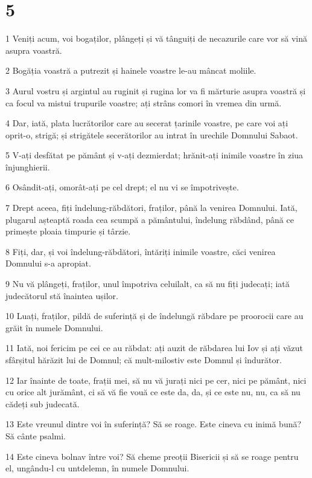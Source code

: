 \chapter{5}

\par 1 Veniți acum, voi bogaților, plângeți și vă tânguiți de necazurile care vor să vină asupra voastră.
\par 2 Bogăția voastră a putrezit și hainele voastre le-au mâncat moliile.
\par 3 Aurul vostru și argintul au ruginit și rugina lor va fi mărturie asupra voastră și ca focul va mistui trupurile voastre; ați strâns comori în vremea din urmă.
\par 4 Dar, iată, plata lucrătorilor care au secerat țarinile voastre, pe care voi ați oprit-o, strigă; și strigătele secerătorilor au intrat în urechile Domnului Sabaot.
\par 5 V-ați desfătat pe pământ și v-ați dezmierdat; hrănit-ați inimile voastre în ziua înjunghierii.
\par 6 Osândit-ați, omorât-ați pe cel drept; el nu vi se împotrivește.
\par 7 Drept aceea, fiți îndelung-răbdători, fraților, până la venirea Domnului. Iată, plugarul așteaptă roada cea scumpă a pământului, îndelung răbdând, până ce primește ploaia timpurie și târzie.
\par 8 Fiți, dar, și voi îndelung-răbdători, întăriți inimile voastre, căci venirea Domnului s-a apropiat.
\par 9 Nu vă plângeți, fraților, unul împotriva celuilalt, ca să nu fiți judecați; iată judecătorul stă înaintea ușilor.
\par 10 Luați, fraților, pildă de suferință și de îndelungă răbdare pe proorocii care au grăit în numele Domnului.
\par 11 Iată, noi fericim pe cei ce au răbdat: ați auzit de răbdarea lui Iov și ați văzut sfârșitul hărăzit lui de Domnul; că mult-milostiv este Domnul și îndurător.
\par 12 Iar înainte de toate, frații mei, să nu vă jurați nici pe cer, nici pe pământ, nici cu orice alt jurământ, ci să vă fie vouă ce este da, da, și ce este nu, nu, ca să nu cădeți sub judecată.
\par 13 Este vreunul dintre voi în suferință? Să se roage. Este cineva cu inimă bună? Să cânte psalmi.
\par 14 Este cineva bolnav între voi? Să cheme preoții Bisericii și să se roage pentru el, ungându-l cu untdelemn, în numele Domnului.
